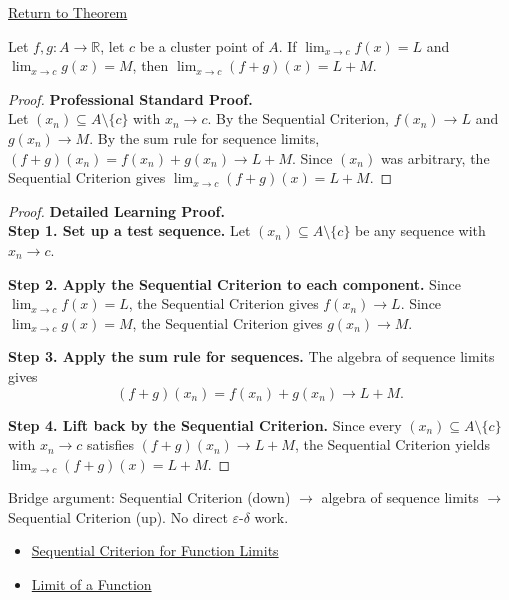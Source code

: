 \newpage
{}
\label{prf:limit-sum}

\begin{remark*}[Return]
\hyperref[thm:limit-sum]{Return to Theorem}
\end{remark*}

\begin{theorem*}
Let $f, g : A \to \mathbb{R}$, let $c$ be a cluster point of $A$. If
$\lim_{x\to c}f(x)=L$ and $\lim_{x\to c}g(x)=M$, then
$\lim_{x\to c}(f+g)(x) = L+M$.
\end{theorem*}

\begin{proof}
\textbf{Professional Standard Proof.}~\\
Let $(x_n) \subseteq A \setminus \{c\}$ with $x_n \to c$.
By the Sequential Criterion, $f(x_n) \to L$ and $g(x_n) \to M$.
By the sum rule for sequence limits, $(f+g)(x_n) = f(x_n)+g(x_n) \to L+M$.
Since $(x_n)$ was arbitrary, the Sequential Criterion gives
$\lim_{x\to c}(f+g)(x) = L+M$.
\end{proof}

\begin{proof}
\textbf{Detailed Learning Proof.}~\\
\textbf{Step 1. Set up a test sequence.}
Let $(x_n) \subseteq A \setminus \{c\}$ be any sequence with $x_n \to c$.

\textbf{Step 2. Apply the Sequential Criterion to each component.}
Since $\lim_{x\to c}f(x)=L$, the Sequential Criterion gives $f(x_n) \to L$.
Since $\lim_{x\to c}g(x)=M$, the Sequential Criterion gives $g(x_n) \to M$.

\textbf{Step 3. Apply the sum rule for sequences.}
The algebra of sequence limits gives
\[
  (f+g)(x_n) = f(x_n)+g(x_n) \to L+M.
\]

\textbf{Step 4. Lift back by the Sequential Criterion.}
Since every $(x_n) \subseteq A \setminus \{c\}$ with $x_n \to c$ satisfies
$(f+g)(x_n) \to L+M$, the Sequential Criterion yields
$\lim_{x\to c}(f+g)(x) = L+M$.
\end{proof}

\begin{remark*}
Bridge argument: Sequential Criterion (down) $\to$ algebra of sequence limits
$\to$ Sequential Criterion (up). No direct $\varepsilon$-$\delta$ work.
\end{remark*}

\begin{remark*}[Dependencies]
\begin{itemize}
  \item \hyperref[prop:sequential-criterion-limits]{Sequential Criterion for Function Limits}
  \item \hyperref[def:limit-function]{Limit of a Function}
\end{itemize}
\end{remark*}
